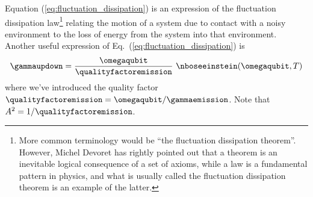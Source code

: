 Equation (\ref{eq:fluctuation_dissipation}) is an expression of the fluctuation dissipation law\footnote{More common terminology would be ``the fluctuation dissipation theorem''. However, Michel Devoret has rightly pointed out that a theorem is an inevitable logical consequence of a set of axioms, while a law is a fundamental pattern in physics, and what is usually called the fluctuation dissipation theorem is an example of the latter.} relating the motion of a system due to contact with a noisy environment to the loss of energy from the system into that environment.
Another useful expression of Eq.~(\ref{eq:fluctuation_dissipation}) is
\begin{equation}
  \gammaupdown = \frac{\omegaqubit}{\qualityfactoremission} ~ \nboseeinstein(\omegaqubit, T)
  \label{eq:fluctuation_dissipation_quality_factor}
\end{equation}
where we've introduced the quality factor $\qualityfactoremission = \omegaqubit / \gammaemission$.
Note that $A^2 = 1 / \qualityfactoremission$.
